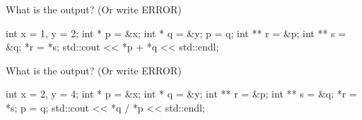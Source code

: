 

\nextq
What is the output? (Or write ERROR)
\begin{console}
int x = 1, y = 2;
int * p = &x;
int * q = &y;
p = q;
int ** r = &p;
int ** s = &q;
*r = *s;
std::cout << *p + *q << std::endl;
\end{console}
\ANSWER
\begin{answercode}

\end{answercode}

\nextq
What is the output? (Or write ERROR)
\begin{console}
int x = 2, y = 4;
int * p = &x;
int * q = &y;
int ** r = &p;
int ** s = &q;
*r = *s;
p = q;
std::cout << *q / *p << std::endl;
\end{console}
\ANSWER
\begin{answercode}

\end{answercode}

